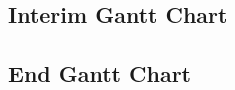 \begin{landscape}
\newpage 
\subsection{Interim Gantt Chart}





\subsection{End Gantt Chart}

\end{landscape}

